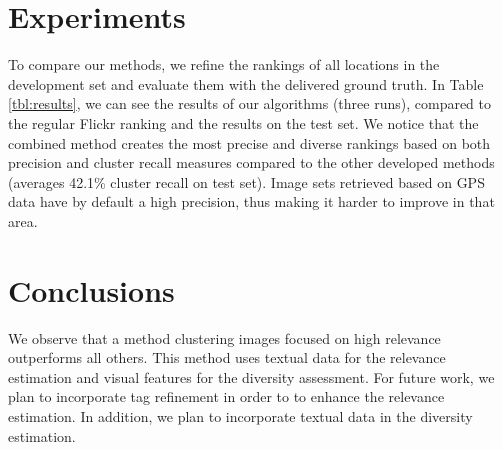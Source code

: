 \documentclass{acm_proc_article-me11_tweaked}
\begin{document}
\section{Experiments}
To compare our methods, we refine the rankings of all locations in the development set and evaluate them with the delivered ground truth.
In Table \ref{tbl:results}, we can see the results of our algorithms (three runs), compared to the regular Flickr ranking and the results on the test set.
We notice that the combined method creates the most precise and diverse rankings based on both precision and cluster recall measures compared to the other developed methods (averages 42.1\% cluster recall on test set). 
Image sets retrieved based on GPS data have by default a high precision, thus making it harder to improve in that area.


\section{Conclusions}
We observe that a method clustering images focused on high relevance outperforms all others.
This method uses textual data for the relevance estimation and visual features for the diversity assessment.
For future work, we plan to incorporate tag refinement in order to to enhance the relevance estimation. In addition, we plan to incorporate textual data in the diversity estimation.

%

\end{document}
